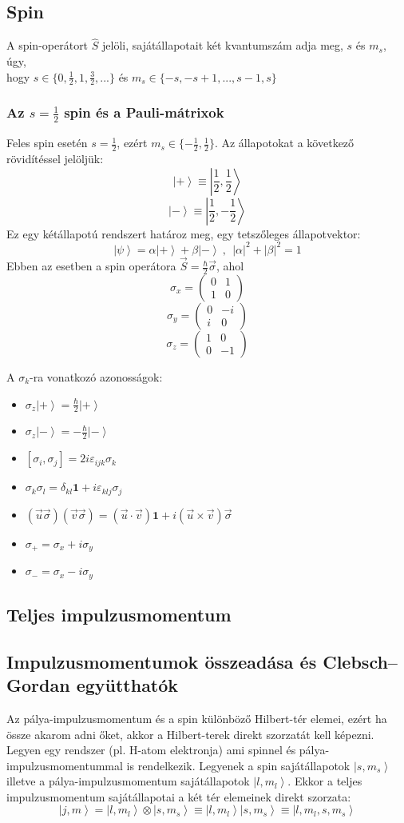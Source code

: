 \documentclass[12pt]{article}
\theoremstyle{plain}
\newcommand{\ket}[1]{\left| #1 \right >}
\newcommand{\commut}[2]{\left [ #1 , #2 \right]}
\newcommand{\sigx}{\sigma_x}
\newcommand{\sigy}{\sigma_y}
\newcommand{\sigz}{\sigma_z}
\newcommand{\paulix}{
    \left( \begin{array}{cc}
        0 & 1 \\
        1 & 0
    \end{array}
    \right)
}
\newcommand{\pauliy}{
    \left( \begin{array}{cc}
        0 & -i \\
        i & 0
    \end{array}
    \right)
}
\newcommand{\pauliz}{
    \left( \begin{array}{cc}
        1 & 0 \\
        0 & -1
    \end{array}
    \right)
}
\begin{document}
\subsection{Spin}
A spin-operátort $\hat S$ jelöli, sajátállapotait két kvantumszám adja meg, $s$ és $m_s$, úgy, \\ hogy
$s\in\{0, \frac{1}{2}, 1, \frac{3}{2}, ...\}$ és $m_s \in \{-s, -s+1,...,s-1, s\}$
\subsubsection{Az $s = \frac{1}{2}$ spin és a Pauli-mátrixok}
Feles spin esetén $s=\frac{1}{2}$, ezért $m_s \in \{-\frac{1}{2},\frac{1}{2}\}$. Az állapotokat a következő rövidítéssel jelöljük:
\[
    \ket + \equiv \ket{\frac{1}{2}, \frac{1}{2}}    
\]
\[
    \ket - \equiv \ket{\frac{1}{2}, -\frac{1}{2}}    
\]
Ez egy kétállapotú rendszert határoz meg, egy tetszőleges állapotvektor:
\[
    \ket\psi = \alpha\ket+ + \beta\ket- ~,~~ |\alpha|^2 + |\beta|^2 = 1    
\]
Ebben az esetben a spin operátora $\vec S = \frac{\hbar}{2}\vec{\sigma}$, ahol
\[ \sigx = \paulix \]
\[ \sigy = \pauliy \]
\[ \sigz = \pauliz \]

A $\sigma_k$-ra vonatkozó azonosságok:
\begin{itemize}
    \item $\sigz \ket+ = \frac{\hbar}{2}\ket+$
    \item $\sigz \ket- = -\frac{\hbar}{2}\ket-$    
    \item $
        \commut{\sigma_i}{\sigma_j} = 2i\varepsilon_{ijk}\sigma_k
    $
    \item $
        \sigma_k\sigma_l = \delta_{kl}\mathbf 1 + i\varepsilon_{klj}\sigma_j
    $
    \item $
        (\vec u \vec \sigma)(\vec v\vec\sigma) = (\vec u\cdot\vec v)\mathbf 1 + i(\vec u \times\vec v)\vec\sigma
    $
    \item $
        \sigma_+ = \sigx + i\sigy
    $
    \item $
        \sigma_- = \sigx - i\sigy
    $

\end{itemize}
\subsection{Teljes impulzusmomentum}
\subsection{Impulzusmomentumok összeadása és Clebsch–Gordan együtthatók}
Az pálya-impulzusmomentum és a spin különböző Hilbert-tér elemei, ezért ha össze akarom adni őket,
akkor a Hilbert-terek direkt szorzatát kell képezni.
Legyen egy rendszer (pl. H-atom elektronja) ami spinnel és pálya-impulzusmomentummal is rendelkezik.
Legyenek a spin sajátállapotok $\ket{s, m_s}$ illetve a pálya-impulzusmomentum sajátállapotok $\ket{l, m_l}$.
Ekkor a teljes impulzusmomentum sajátállapotai a két tér elemeinek direkt szorzata:
\[
    \ket{j, m} = \ket{l, m_l} \otimes \ket{s, m_s} \equiv \ket{l, m_l}\ket{s, m_s} \equiv \ket{l, m_l,s, m_s}
\] 
\end{document}

